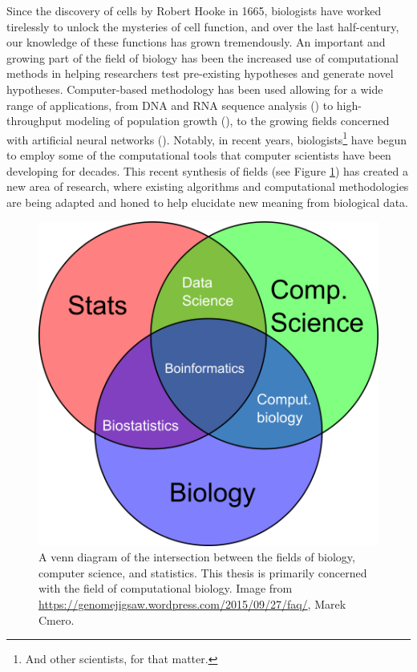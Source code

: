 \documentclass[12pt,twoside]{reedthesis}
\theoremstyle{definition}
\begin{document}
\onehalfspacing

Since the discovery of cells by Robert Hooke in 1665, biologists have worked tirelessly to unlock the mysteries of cell function, and over the last half-century, our knowledge of these functions has grown tremendously. An important and growing part of the field of biology has been the increased use of computational methods in helping researchers test pre-existing hypotheses and generate novel hypotheses. Computer-based methodology has been used allowing for a wide range of applications, from DNA and RNA sequence analysis (\cite{humanGenome}) to high-throughput modeling of population growth (\cite{Anderson2005}), to the growing fields concerned with artificial neural networks (\cite{Chon1996}). Notably, in recent years, biologists\footnote{And other scientists, for that matter.} have begun to employ some of the computational tools that computer scientists have been developing for decades. This recent synthesis of fields (see Figure \ref{fig:bioinf_venn}) has created a new area of research, where existing algorithms and computational methodologies are being adapted and honed to help elucidate new meaning from biological data.\par

 \begin{figure}[!h]
   \begin{center}
     \includegraphics[width=\textwidth/2]{bioinformatics_venn}
   \caption[Fields of bioinformatics.]{A venn diagram of the intersection between the fields of biology, computer science, and statistics. This thesis is primarily concerned with the field of computational biology. Image from \url{https://genomejigsaw.wordpress.com/2015/09/27/faq/}, Marek Cmero.}
   \label{fig:bioinf_venn}
   \end{center}
 \end{figure}
\end{document}
